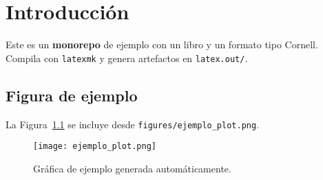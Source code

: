 \chapter{Introducción}
Este es un \textbf{monorepo} de ejemplo con un libro y un formato tipo Cornell.
Compila con \texttt{latexmk} y genera artefactos en \texttt{latex.out/}.

\section{Figura de ejemplo}
La Figura~\ref{fig:plot} se incluye desde \texttt{figures/ejemplo\_plot.png}.

\begin{figure}[h]
    \centering
    \texttt{[image: ejemplo\_plot.png]}
    \caption{Gráfica de ejemplo generada automáticamente.}
    \label{fig:plot}
\end{figure}